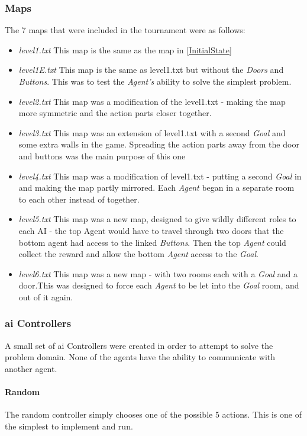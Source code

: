 \documentclass{IEEEtran}
\begin{document}
\subsubsection{Maps}
The 7 maps that were included in the tournament were as follows:
\begin{itemize}
\item{\emph{level1.txt} This map is the same as the map in \ref{InitialState}}
\item{\emph{level1E.txt} This map is the same as level1.txt but without the \emph{Doors} and \emph{Buttons}. This was to test the \emph{Agent's} ability to solve the simplest problem.}
\item{\emph{level2.txt} This map was a modification of the level1.txt - making the map more symmetric and the action parts closer together.}
\item{\emph{level3.txt} This map was an extension of level1.txt with a second \emph{Goal} and some extra walls in the game. Spreading the action parts away from the door and buttons was the main purpose of this one}
\item{\emph{level4.txt} This map was a modification of level1.txt - putting a second \emph{Goal} in and making the map partly mirrored. Each \emph{Agent} began in a separate room to each other instead of together.}
\item{\emph{level5.txt} This map was a new map, designed to give wildly different roles to each AI - the top Agent would have to travel through two doors that the bottom agent had access to the linked \emph{Buttons}. Then the top \emph{Agent} could collect the reward and allow the bottom \emph{Agent} access to the \emph{Goal}.}
\item{\emph{level6.txt} This map was a new map - with two rooms each with a \emph{Goal} and a door.This was designed to force each \emph{Agent} to be let into the \emph{Goal} room, and out of it again.}
\end{itemize}

\subsubsection{\gls{ai} Controllers}
A small set of \gls{ai} Controllers were created in order to attempt to solve the problem domain. None of the agents have the ability to communicate with another agent.
\paragraph{Random}
The random controller simply chooses one of the possible 5 actions. This is one of the simplest to implement and run.
\end{document}
